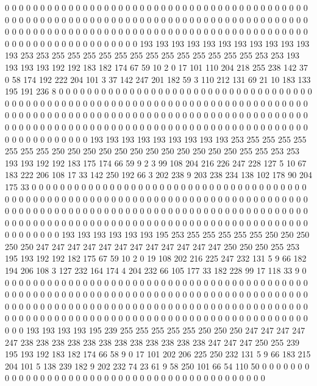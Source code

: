 0 0 0 0 0 0 0 0 0 0 0 0 0 0 0 0 0 0 0 0
0 0 0 0 0 0 0 0 0 0 0 0 0 0 0 0 0 0 0 0
0 0 0 0 0 0 0 0 0 0 0 0 0 0 0 0 0 0 0 0
0 0 0 0 0 0 0 0 0 0 0 0 0 0 0 0 0 0 0 0
0 0 0 0 0 0 0 0 0 0 0 0 0 0 0 0 0 0 0 0
0 0 0 0 0 0 0 0 0 0 0 0 0 0 0 0 0 0 0 0
0 0 0 0 0 0 0 0 0 0 0 0 0 0 0 0 0 0 0 0
0 0 0 0 0 0 0 0 193 193 193 193 193 193 193 193 193 193 193 193
253 253 255 255 255 255 255 255 255 255 255 255 255 255 255 253 253 193 193 193
193 192 192 183 182 174 67 59 10 2 0 17 101 110 204 218 255 238 142 37
0 58 174 192 222 204 101 3 37 142 247 201 182 59 3 110 212 131 69 21
10 183 133 195 191 236 8 0 0 0 0 0 0 0 0 0 0 0 0 0
0 0 0 0 0 0 0 0 0 0 0 0 0 0 0 0 0 0 0 0
0 0 0 0 0 0 0 0 0 0 0 0 0 0 0 0 0 0 0 0
0 0 0 0 0 0 0 0 0 0 0 0 0 0 0 0 0 0 0 0
0 0 0 0 0 0 0 0 0 0 0 0 0 0 0 0 0 0 0 0
0 0 0 0 0 0 0 0 0 0 0 0 0 0 0 0 0 0 0 0
0 0 0 0 0 0 0 0 0 0 0 0 0 0 0 0 0 0 0 0
0 0 0 0 0 0 0 0 0 0 0 0 0 0 0 0 0 0 0 0
0 0 0 0 0 0 0 0 0 0 0 0 0 0 0 0 0 0 0 0
0 0 0 0 193 193 193 193 193 193 193 193 193 253 255 255 255 255 255 255
255 250 250 250 250 250 250 250 250 250 250 250 250 255 255 253 253 193 193 192
192 183 175 174 66 59 9 2 3 99 108 204 216 226 247 228 127 5 10 67
183 222 206 108 17 33 142 250 192 66 3 202 238 9 203 238 234 138 102 178
90 204 175 33 0 0 0 0 0 0 0 0 0 0 0 0 0 0 0 0
0 0 0 0 0 0 0 0 0 0 0 0 0 0 0 0 0 0 0 0
0 0 0 0 0 0 0 0 0 0 0 0 0 0 0 0 0 0 0 0
0 0 0 0 0 0 0 0 0 0 0 0 0 0 0 0 0 0 0 0
0 0 0 0 0 0 0 0 0 0 0 0 0 0 0 0 0 0 0 0
0 0 0 0 0 0 0 0 0 0 0 0 0 0 0 0 0 0 0 0
0 0 0 0 0 0 0 0 0 0 0 0 0 0 0 0 0 0 0 0
0 0 0 0 0 0 0 0 0 0 0 0 0 0 0 0 0 0 0 0
0 0 0 0 0 0 0 0 0 0 0 0 0 0 0 0 0 0 0 0
193 193 193 193 193 193 195 253 255 255 255 255 255 250 250 250 250 250 247 247
247 247 247 247 247 247 247 247 247 247 250 250 250 255 253 195 193 192 192 182
175 67 59 10 2 0 19 108 202 216 225 247 232 131 5 9 66 182 194 206
108 3 127 232 164 174 4 204 232 66 105 177 33 182 228 99 17 118 33 9
0 0 0 0 0 0 0 0 0 0 0 0 0 0 0 0 0 0 0 0
0 0 0 0 0 0 0 0 0 0 0 0 0 0 0 0 0 0 0 0
0 0 0 0 0 0 0 0 0 0 0 0 0 0 0 0 0 0 0 0
0 0 0 0 0 0 0 0 0 0 0 0 0 0 0 0 0 0 0 0
0 0 0 0 0 0 0 0 0 0 0 0 0 0 0 0 0 0 0 0
0 0 0 0 0 0 0 0 0 0 0 0 0 0 0 0 0 0 0 0
0 0 0 0 0 0 0 0 0 0 0 0 0 0 0 0 0 0 0 0
0 0 0 0 0 0 0 0 0 0 0 0 0 0 0 0 0 0 0 0
0 0 0 0 0 0 0 0 0 0 0 0 0 0 0 0 193 193 193 193
195 239 255 255 255 255 255 250 250 250 247 247 247 247 247 238 238 238 238 238
238 238 238 238 238 238 238 247 247 247 250 255 239 195 193 192 183 182 174 66
58 9 0 17 101 202 206 225 250 232 131 5 9 66 183 215 204 101 5 138
239 182 9 202 232 74 23 61 9 58 250 101 66 54 110 50 0 0 0 0
0 0 0 0 0 0 0 0 0 0 0 0 0 0 0 0 0 0 0 0
0 0 0 0 0 0 0 0 0 0 0 0 0 0 0 0 0 0 0 0
